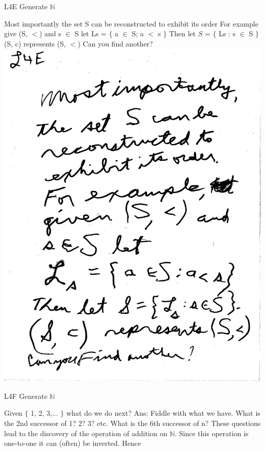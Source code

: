 \documentclass[10pt,a4paper]{article}
\begin{document}
{{\begin{Large}
L4E Generate $\mathbb{N}$
\end{Large}
Most importantly the set S can be reconstructed to exhibit its order For example give (S, $<$) and s $\in$ S let Ls
= $\lbrace$ a $\in$ S; a $<$ s $\rbrace$ Then let $S$ = $\lbrace$ Ls
: s $\in$ S $\rbrace$ (S, c) represents (S, $<$) Can you find another?
\includegraphics[scale=0.5]{Pages/generateN5.pdf}

\newpage

\begin{Large}
L4F Generate $\mathbb{N}$
\end{Large}

Given $\lbrace$ 1, 2, 3,... $\rbrace$ what do we do next? Ans: Fiddle with what we have. What is the 2nd successor of 1? 2? 3? etc. What is the 6th successor of n? These questions lead to the discovery of the operation of addition on $\mathbb{N}$. Since this operation is one-to-one it can (often) be inverted. Hence

}}
\end{document}
